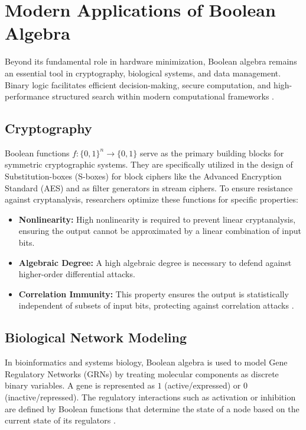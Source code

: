 \section{Modern Applications of Boolean Algebra}
Beyond its fundamental role in hardware minimization, Boolean algebra remains an essential tool in cryptography, biological systems, and data management. Binary logic facilitates efficient decision-making, secure computation, and high-performance structured search within modern computational frameworks \cite{picek2016cryptographic}.

\subsection{Cryptography}
Boolean functions $f: \{0,1\}^n \to \{0,1\}$ serve as the primary building blocks for symmetric cryptographic systems. They are specifically utilized in the design of Substitution-boxes (S-boxes) for block ciphers like the Advanced Encryption Standard (AES) and as filter generators in stream ciphers. To ensure resistance against cryptanalysis, researchers optimize these functions for specific properties:
\begin{itemize}
    \item \textbf{Nonlinearity:} High nonlinearity is required to prevent linear cryptanalysis, ensuring the output cannot be approximated by a linear combination of input bits.
    \item \textbf{Algebraic Degree:} A high algebraic degree is necessary to defend against higher-order differential attacks.
    \item \textbf{Correlation Immunity:} This property ensures the output is statistically independent of subsets of input bits, protecting against correlation attacks \cite{tu2012boolean}.
\end{itemize}

\subsection{Biological Network Modeling}
In bioinformatics and systems biology, Boolean algebra is used to model Gene Regulatory Networks (GRNs) by treating molecular components as discrete binary variables. A gene is represented as $1$ (active/expressed) or $0$ (inactive/repressed). The regulatory interactions such as activation or inhibition are defined by Boolean functions that determine the state of a node based on the current state of its regulators \cite{puvsnik2022review}.

